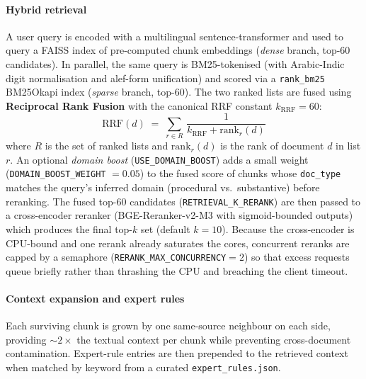 \documentclass[final,1p,times]{elsarticle}
\begin{document}
\paragraph{Hybrid retrieval} A user query is encoded with a multilingual
sentence-transformer and used to query a FAISS index of pre-computed chunk
embeddings (\emph{dense} branch, top-60 candidates). In parallel, the same
query is BM25-tokenised (with Arabic-Indic digit normalisation and alef-form
unification) and scored via a \texttt{rank\_bm25} BM25Okapi index (\emph{sparse}
branch, top-60). The two ranked lists are fused using \textbf{Reciprocal Rank
Fusion} with the canonical RRF constant $k_{\text{RRF}}=60$:
\begin{equation}
\mathrm{RRF}(d) \;=\; \sum_{r \in R}\,\frac{1}{k_{\text{RRF}} + \mathrm{rank}_r(d)}
\label{eq:rrf}
\end{equation}
where $R$ is the set of ranked lists and $\mathrm{rank}_r(d)$ is the rank of
document $d$ in list $r$. An optional \emph{domain boost}
(\texttt{USE\_DOMAIN\_BOOST}) adds a small weight (\texttt{DOMAIN\_BOOST\_WEIGHT}
$=0.05$) to the fused score of chunks whose \texttt{doc\_type} matches the
query's inferred domain (procedural vs.\ substantive) before reranking. The
fused top-60 candidates (\texttt{RETRIEVAL\_K\_RERANK}) are then passed to a
cross-encoder reranker (BGE-Reranker-v2-M3 with sigmoid-bounded outputs) which
produces the final top-$k$ set (default $k=10$). Because the cross-encoder is
CPU-bound and one rerank already saturates the cores, concurrent reranks are
capped by a semaphore (\texttt{RERANK\_MAX\_CONCURRENCY}$=2$) so that excess
requests queue briefly rather than thrashing the CPU and breaching the client
timeout.

\paragraph{Context expansion and expert rules} Each surviving chunk is grown
by one same-source neighbour on each side, providing $\sim 2\times$ the
textual context per chunk while preventing cross-document contamination.
Expert-rule entries are then prepended to the retrieved context when matched
by keyword from a curated \texttt{expert\_rules.json}.
\end{document}

